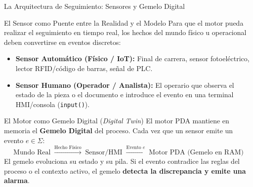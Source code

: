 \documentclass[10pt, aspectratio=169]{beamer}
\begin{document}
\begin{frame}{La Arquitectura de Seguimiento: Sensores y Gemelo Digital}
	\begin{block}{El Sensor como Puente entre la Realidad y el Modelo}
		Para que el motor pueda realizar el seguimiento en tiempo real, los hechos del mundo físico u operacional deben convertirse en eventos discretos:
		\begin{itemize}
			\item \textbf{Sensor Automático (Físico / IoT):} Final de carrera, sensor fotoeléctrico, lector RFID/código de barras, señal de PLC.
			\item \textbf{Sensor Humano (Operador / Analista):} El operario que observa el estado de la pieza o el documento e introduce el evento en una terminal HMI/consola (\texttt{input()}).
		\end{itemize}
	\end{block}

	\begin{alertblock}{El Motor como Gemelo Digital (\emph{Digital Twin})}
		El motor PDA mantiene en memoria el \textbf{Gemelo Digital} del proceso. Cada vez que un sensor emite un evento $e \in \Sigma$:
		\[ \text{Mundo Real} \;\xrightarrow{\text{Hecho Físico}}\; \text{Sensor/HMI} \;\xrightarrow{\text{Evento } e}\; \text{Motor PDA (Gemelo en RAM)} \]
		El gemelo evoluciona su estado y su pila. Si el evento contradice las reglas del proceso o el contexto activo, el gemelo \textbf{detecta la discrepancia y emite una alarma}.
	\end{alertblock}
\end{frame}
\end{document}
